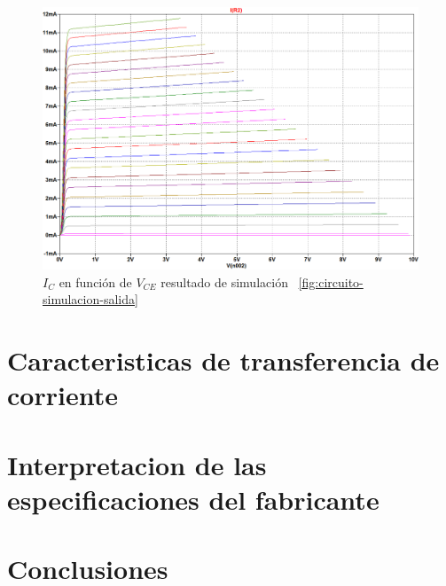\documentclass[chaptersright]{informeutn}
\begin{document}
    \begin{figure}[H]
        \centering
        \includegraphics[width=1\textwidth, keepaspectratio]{pictures/curva-simulacion-salida.png}
        \caption{$I_C$ en función de $V_{CE}$ resultado de simulación 
        ~\ref{fig:circuito-simulacion-salida}}
    \end{figure}


\chapter{Caracteristicas de transferencia de corriente}

\chapter{Interpretacion de las especificaciones del fabricante}

\chapter{Conclusiones}
\end{document}
